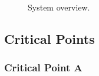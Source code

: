 \begin{figure}[h!]
  \centering
  \caption{System overview.}
  \label{fig:system}
\end{figure}

\clearpage

\subsection{Critical Points}







\subsubsection{Critical Point A}

